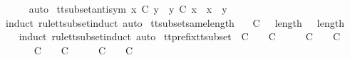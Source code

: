 \begin{isabellebody}
\ \ \ \ \isamarkupfalse%
\ auto\isanewline
{}\isamarkupfalse%
%
\endisatagproof
{\isafoldproof}%
%
\isadelimproof
\isanewline
%
\endisadelimproof
\isanewline
{}\isamarkupfalse%
\ tt{\isacharunderscore}subset{\isacharunderscore}antisym{\isacharcolon}\ {\isachardoublequoteopen}x\ {\isasymsubseteq}\isactrlsub C\ y\ {\isasymLongrightarrow}\ y\ {\isasymsubseteq}\isactrlsub C\ x\ {\isasymLongrightarrow}\ x\ {\isacharequal}\ y{\isachardoublequoteclose}\isanewline
%
\isadelimproof
\ \ %
\endisadelimproof
%
\isatagproof
{}\isamarkupfalse%
\ {\isacharparenleft}induct\ rule{\isacharcolon}tt{\isacharunderscore}subset{\isachardot}induct{\isacharcomma}\ auto{\isacharparenright}%
\endisatagproof
{\isafoldproof}%
%
\isadelimproof
\isanewline
%
\endisadelimproof
\isanewline
{}\isamarkupfalse%
\ tt{\isacharunderscore}subset{\isacharunderscore}same{\isacharunderscore}length{\isacharcolon}\isanewline
\ \ {\isachardoublequoteopen}{\isasymrho}\ {\isasymsubseteq}\isactrlsub C\ {\isasymsigma}\ {\isasymLongrightarrow}\ length\ {\isasymrho}\ {\isacharequal}\ length\ {\isasymsigma}{\isachardoublequoteclose}\isanewline
%
\isadelimproof
\ \ %
\endisadelimproof
%
\isatagproof
{}\isamarkupfalse%
\ {\isacharparenleft}induct\ rule{\isacharcolon}tt{\isacharunderscore}subset{\isachardot}induct{\isacharcomma}\ auto{\isacharparenright}%
\endisatagproof
{\isafoldproof}%
%
\isadelimproof
\isanewline
%
\endisadelimproof
\isanewline
{}\isamarkupfalse%
\ tt{\isacharunderscore}prefix{\isacharunderscore}tt{\isacharunderscore}subset{\isacharcolon}\ {\isachardoublequoteopen}{\isasymsigma}{\isacharprime}\ {\isasymle}\isactrlsub C\ {\isasymsigma}\ {\isasymLongrightarrow}\ {\isasymrho}\ {\isasymsubseteq}\isactrlsub C\ {\isasymsigma}\ {\isasymLongrightarrow}\ {\isasymexists}\ {\isasymrho}{\isacharprime}{\isachardot}\ {\isasymrho}{\isacharprime}\ {\isasymsubseteq}\isactrlsub C\ {\isasymsigma}{\isacharprime}\ {\isasymand}\ {\isasymrho}{\isacharprime}\ {\isasymle}\isactrlsub C\ {\isasymrho}{\isachardoublequoteclose}\isanewline
%
\isadelimproof
%
\endisadelimproof
%
\isatagproof
{}\isamarkupfalse%
\ {\isacharminus}\isanewline
\ \ \isamarkupfalse%
\ {\isachardoublequoteopen}{\isasymAnd}\ {\isasymsigma}{\isacharprime}{\isachardot}\ {\isasymsigma}{\isacharprime}\ {\isasymle}\isactrlsub C\ {\isasymsigma}\ {\isasymLongrightarrow}\ {\isasymrho}\ {\isasymsubseteq}\isactrlsub C\ {\isasymsigma}\ {\isasymLongrightarrow}\ {\isasymexists}\ {\isasymrho}{\isacharprime}{\isachardot}\ {\isasymrho}{\isacharprime}\ {\isasymsubseteq}\isactrlsub C\ {\isasymsigma}{\isacharprime}\ {\isasymand}\ {\isasymrho}{\isacharprime}\ {\isasymle}\isactrlsub C\ {\isasymrho}{\isachardoublequoteclose}\isanewline

\end{isabellebody}
